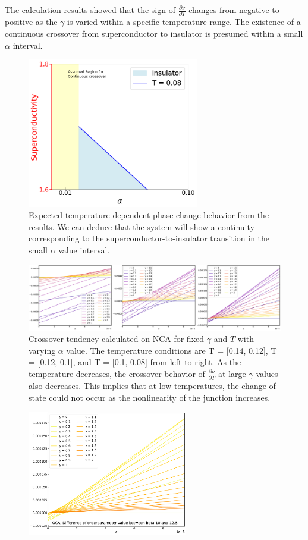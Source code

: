 \documentclass{article}[12pt]
\begin{document}
\begin{spacing}{1.5}
  The calculation results showed that the sign of $\frac{\partial \nu}{\partial T}$ changes from negative to positive 
as the $\gamma$ is varied within a specific temperature range. The existence of a continuous crossover from superconductor 
to insulator is presumed within a small $\alpha$ interval.
\begin{figure}[H]
  \centerline{\includegraphics[width=7.5cm]{TexFigure/4_3_12_smallalp.png}}
  \caption{Expected temperature-dependent phase change behavior from the results.
  We can deduce that the system will show a continuity corresponding to the superconductor-to-insulator transition in the small $\alpha$ value interval.}
\end{figure}
\pagebreak
\vfill
\begin{figure}[H]
  \vfill
  \centerline{\includegraphics[width=17cm]{TexFigure/4_3_13_litlalp_1.png}}
  \caption{Crossover tendency calculated on NCA for fixed $\gamma$ and $T$ with varying $\alpha$ value. The temperature conditions are T = [0.14, 0.12], T = [0.12, 0.1], and T = [0.1, 0.08] 
  from left to right. As the temperature decreases, the crossover behavior of $\frac{\partial \nu}{\partial T}$ 
  at large $\gamma$ values also decreases. This implies that at low temperatures, the change of state could not occur 
  as the nonlinearity of the junction increases.}
\end{figure}
\begin{figure}[H]
  \centerline{\includegraphics[width=7cm]{TexFigure/4_3_14_Diff_Os3_b_10_12.5_n.png}}

\end{figure}
\end{spacing}
\end{document}
